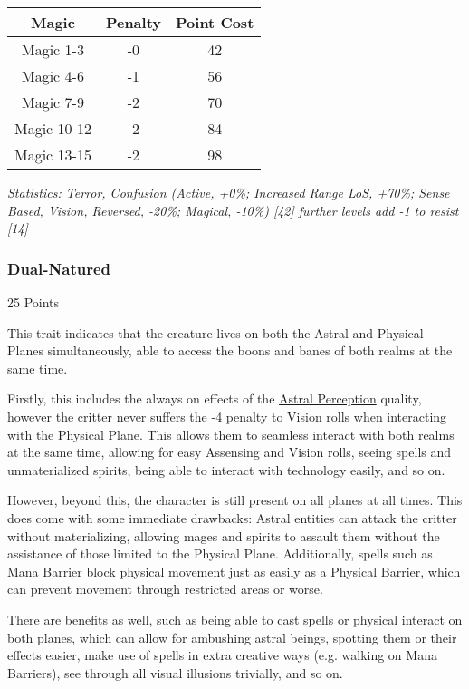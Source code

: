 \begin{multicols*}{3}
	\begin{center}
		\begin{tabular}{|c|c|c|}
			\hline
			Magic & Penalty & Point Cost\\
			\hline
			\hline
			Magic 1-3 & -0 & 42 \\
			Magic 4-6 & -1 & 56 \\
			Magic 7-9 & -2 & 70 \\
			Magic 10-12 & -2 & 84 \\
			Magic 13-15 & -2 & 98 \\
			\hline
		\end{tabular}
	\end{center}
	
	\textcolor{OliveGreen}{\textit{Statistics: Terror, Confusion (Active, +0\%; Increased Range LoS, +70\%; Sense Based, Vision, Reversed, -20\%; Magical, -10\%) [42] further levels add -1 to resist [14]
	}}

	\subsubsection{Dual-Natured}\label{dual_natured}
	\begin{flushright}
		25 Points
	\end{flushright}

	This trait indicates that the creature lives on both the Astral and Physical Planes simultaneously, able to access the boons and banes of both realms at the same time.
	
	Firstly, this includes the always on effects of the \hyperref[astral_perception]{Astral Perception} quality, however the critter never suffers the -4 penalty to Vision rolls when interacting with the Physical Plane. This allows them to seamless interact with both realms at the same time, allowing for easy Assensing and Vision rolls, seeing spells and unmaterialized spirits, being able to interact with technology easily, and so on.
	
	However, beyond this, the character is still present on all planes at all times. This does come with some immediate drawbacks: Astral entities can attack the critter without materializing, allowing mages and spirits to assault them without the assistance of those limited to the Physical Plane. Additionally, spells such as Mana Barrier block physical movement just as easily as a Physical Barrier, which can prevent movement through restricted areas or worse.
	
	There are benefits as well, such as being able to cast spells or physical interact on both planes, which can allow for ambushing astral beings, spotting them or their effects easier, make use of spells in extra creative ways (e.g. walking on Mana Barriers), see through all visual illusions trivially, and so on.


\end{multicols*}
